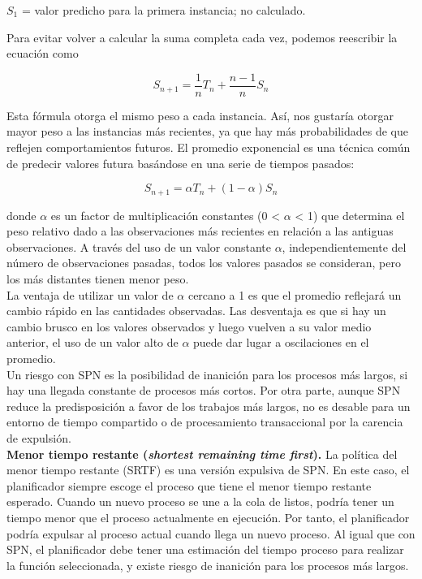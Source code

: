 \documentclass{article}
\begin{document}
				$S_{1}$ = valor predicho para la primera instancia; no calculado.
				
				Para evitar volver a calcular la suma completa cada vez, podemos reescribir la ecuación como 
				
				\begin{equation}
				S_{n+1}=\frac{1}{n}T_{n}+\frac{n-1}{n}S_{n}
				\end{equation}
				
				Esta fórmula otorga el mismo peso a cada instancia. Así, nos gustaría otorgar mayor peso a las instancias más recientes, ya que hay más probabilidades de que reflejen comportamientos futuros. El promedio exponencial es una técnica común de predecir valores futura basándose en una serie de tiempos pasados:
				
				 \begin{equation}
				 S_{n+1}=\alpha T_{n} + (1-\alpha)S_{n}
				 \end{equation}
				 
				 donde $\alpha$ es un factor de multiplicación constantes (0 < $\alpha$ < 1) que determina el peso relativo dado a las observaciones más recientes en relación a las antiguas observaciones. A través del uso de un valor constante $\alpha$, independientemente del número de observaciones pasadas, todos los valores pasados se consideran, pero los más distantes tienen menor peso. \\
				 
				 La ventaja de utilizar un valor de $\alpha$ cercano a 1 es que el promedio reflejará un cambio rápido en las cantidades observadas. Las desventaja es que si hay un cambio brusco en los valores observados y luego vuelven a su valor medio anterior, el uso de un valor alto de $\alpha$ puede dar lugar a oscilaciones en el promedio. \\
				 
				 Un riesgo con SPN es la posibilidad de inanición para los procesos más largos, si hay una llegada constante de procesos más cortos. Por otra parte, aunque SPN reduce la predisposición a favor de los trabajos más largos, no es desable para un entorno de tiempo compartido o de procesamiento transaccional por la carencia de expulsión. \\
				 
				 \textbf{Menor tiempo restante (\textit{shortest remaining time first}).} La política del menor tiempo restante (SRTF) es una versión expulsiva de SPN. En este caso, el planificador siempre escoge el proceso que tiene el menor tiempo restante esperado. Cuando un nuevo proceso se une a la cola de listos, podría tener un tiempo menor que el proceso actualmente en ejecución. Por tanto, el planificador podría expulsar al proceso actual cuando llega un nuevo proceso. Al igual que con SPN, el planificador debe tener una estimación del tiempo proceso para realizar la función seleccionada, y existe riesgo de inanición para los procesos más largos. \\
				 
\end{document}
